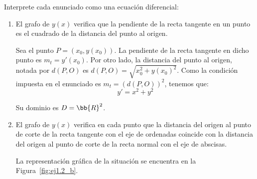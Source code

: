 \begin{ejercicio} \label{ej:1.2}
    Interprete cada enunciado como una ecuación diferencial:
    \begin{enumerate}
        \item El grafo de \(y(x)\) verifica que la pendiente de la recta tangente en un punto es el cuadrado de la distancia del punto al origen.
        
        Sea el punto \(P=(x_0, y(x_0))\). La pendiente de la recta tangente en dicho punto es \(m_t = y'(x_0)\).
        Por otro lado, la distancia del punto al origen, notada por $d(P, O)$ es \(d(P, O)=\sqrt{x_0^2 + y(x_0)^2}\). Como la condición impuesta en el enunciado es $m_t=(d(P, O))^2$, tenemos que:
        \begin{equation*}
            y'= x^2 + y^2
        \end{equation*}

        Su dominio es $D=\bb{R}^2$.
        \item \label{ej:1.2_b}
        El grafo de \(y(x)\) verifica en cada punto que la distancia del origen al punto de corte de la recta tangente con el eje de ordenadas coincide con la distancia del origen al punto de corte de la recta normal con el eje de abscisas.
        
        La representación gráfica de la situación se encuentra en la Figura~\ref{fig:ej1.2_b}.
        \begin{figure}
            \centering
\end{figure}
\end{enumerate}
\end{ejercicio}
